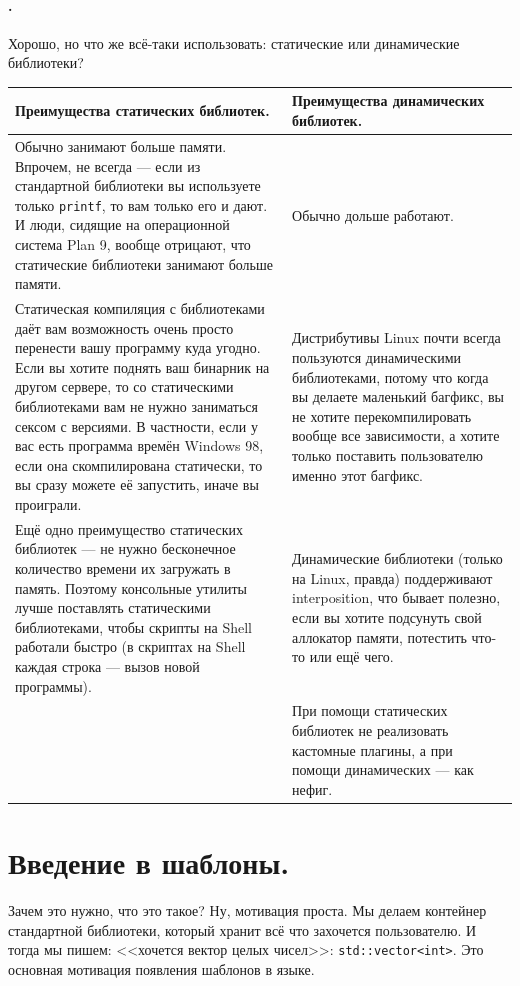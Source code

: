 \documentclass{article}
\begin{document}
    \paragraph{.}
    Хорошо, но что же всё-таки использовать: статические или динамические библиотеки?    \begin{center}
        \begin{tabular}{|m{}|m{}|}
            \hline
            Преимущества статических библиотек. & Преимущества динамических библиотек.\\
            \hline
            Обычно занимают больше памяти. Впрочем, не всегда --- если из стандартной библиотеки вы используете только \texttt{printf}, то вам только его и дают. И люди, сидящие на операционной система Plan 9, вообще отрицают, что статические библиотеки занимают больше памяти. & Обычно дольше работают.\\
            \hline
            Статическая компиляция с библиотеками даёт вам возможность очень просто перенести вашу программу куда угодно. Если вы хотите поднять ваш бинарник на другом сервере, то со статическими библиотеками вам не нужно заниматься сексом с версиями. В частности, если у вас есть программа времён Windows 98, если она скомпилирована статически, то вы сразу можете её запустить, иначе вы проиграли. & Дистрибутивы Linux почти всегда пользуются динамическими библиотеками, потому что когда вы делаете маленький багфикс, вы не хотите перекомпилировать вообще все зависимости, а хотите только поставить пользователю именно этот багфикс.\\
            \hline
            Ещё одно преимущество статических библиотек --- не нужно бесконечное количество времени их загружать в память. Поэтому консольные утилиты лучше поставлять статическими библиотеками, чтобы скрипты на Shell работали быстро (в скриптах на Shell каждая строка --- вызов новой программы). & Динамические библиотеки (только на Linux, правда) поддерживают interposition, что бывает полезно, если вы хотите подсунуть свой аллокатор памяти, потестить что-то или ещё чего.\\
            \hline
            & При помощи статических библиотек не реализовать кастомные плагины, а при помощи динамических --- как нефиг.\\
            \hline
        \end{tabular}
    \end{center}
    \section{Введение в шаблоны.}
    Зачем это нужно, что это такое? Ну, мотивация проста. Мы делаем контейнер стандартной библиотеки, который хранит всё что захочется пользователю. И тогда мы пишем: <<хочется вектор целых чисел>>: \texttt{std::vector<int>}. Это основная мотивация появления шаблонов в языке.
\end{document}
